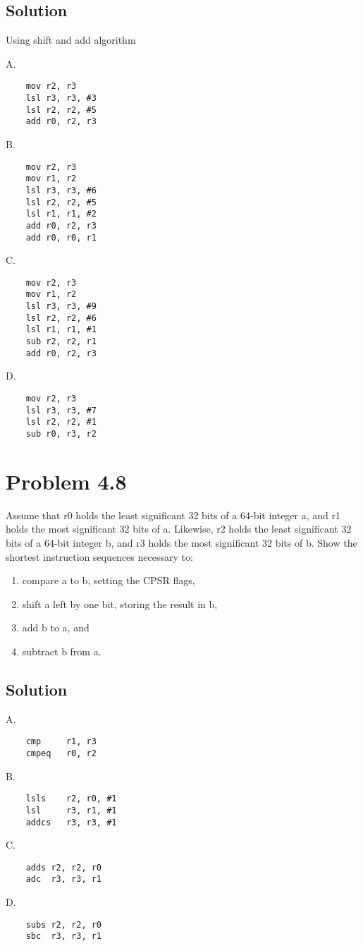\documentclass[letterpaper,11pt]{texMemo} %
\begin{document}
\subsection*{Solution}
Using shift and add algorithm

A.
\begin{lstlisting}
    mov r2, r3
    lsl r3, r3, #3
    lsl r2, r2, #5
    add r0, r2, r3
\end{lstlisting}
B.
\begin{lstlisting}
    mov r2, r3
    mov r1, r2
    lsl r3, r3, #6
    lsl r2, r2, #5
    lsl r1, r1, #2
    add r0, r2, r3
    add r0, r0, r1
\end{lstlisting}
C.
\begin{lstlisting}
    mov r2, r3
    mov r1, r2
    lsl r3, r3, #9
    lsl r2, r2, #6
    lsl r1, r1, #1
    sub r2, r2, r1
    add r0, r2, r3
\end{lstlisting}
D.
\begin{lstlisting}
    mov r2, r3
    lsl r3, r3, #7
    lsl r2, r2, #1
    sub r0, r3, r2
\end{lstlisting}

\section*{Problem 4.8}
Assume that r0 holds the least significant 32 bits of a 64-bit integer a, and r1 holds the most significant 32
bits of a. Likewise, r2 holds the least significant 32 bits of a 64-bit integer b, and r3 holds the most
significant 32 bits of b. Show the shortest instruction sequences necessary to:
\begin{enumerate}[label=\Alph*]
    \item compare a to b, setting the CPSR flags,
    \item shift a left by one bit, storing the result in b,
    \item add b to a, and
    \item subtract b from a.
\end{enumerate}
\subsection*{Solution}
A.
\begin{lstlisting}
    cmp     r1, r3
    cmpeq   r0, r2
\end{lstlisting}
B.
\begin{lstlisting}
    lsls    r2, r0, #1
    lsl     r3, r1, #1
    addcs   r3, r3, #1
\end{lstlisting}
C.
\begin{lstlisting}
    adds r2, r2, r0
    adc  r3, r3, r1
\end{lstlisting}
D.
\begin{lstlisting}
    subs r2, r2, r0
    sbc  r3, r3, r1
\end{lstlisting}
\end{document}
